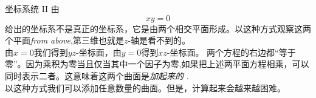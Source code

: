 ﻿\begin{surferPage}[坐标系统II]{坐标系统 II}
由\[xy=0\]给出的坐标系不是真正的坐标系，它是由两个相交平面形成。以这种方式观察这两个平面{\it from above},第三维也就是$z$-轴是看不到的。
\\
\vspace{0.3cm}
由$x=0$我们得到$yz$-坐标面，由$y=0$得到$xz$-坐标面。
两个方程的右边都“等于零”。因为乘积为零当且仅当其中一个因子为零,如果把上述两平面方程相乘，可以同时表示二者。这意味着这两个曲面是{\it 加起来的 }. \\
以这种方式我们可以添加任意数量的曲面。但是，计算起来会越来越困难。
\end{surferPage}

